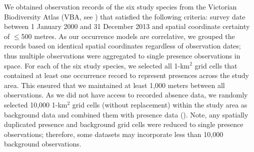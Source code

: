 We obtained observation records of the six study species from the Victorian Biodiversity Atlas (VBA, see ) that satisfied the following criteria: survey date between 1 January 2000 and 31 December 2013 and spatial coordinate certainty of $\leq$500 metres.  As our occurrence models are correlative, we grouped the records based on identical spatial coordinates regardless of observation dates; thus multiple observations were aggregated to single presence observations in space. For each of the six study species, we selected all 1-km$^2$ grid cells that contained at least one occurrence record to represent presences across the study area. This ensured that we maintained at least 1,000 meters between all observations. As we did not have access to recorded absence data, we randomly selected 10,000 1-km$^2$ grid cells (without replacement) within the study area as background data and combined them with presence data (). Note, any spatially duplicated presence and background grid cells were reduced to single presence observations; therefore, some datasets may incorporate less than 10,000 background observations.

